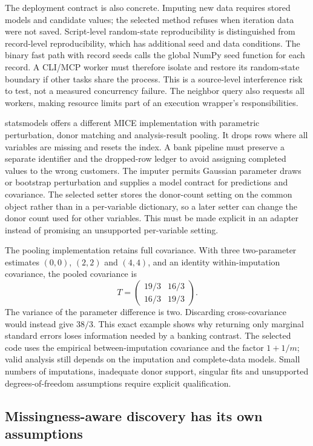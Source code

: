 The deployment contract is also concrete. Imputing new data requires stored models and candidate values; the selected method refuses when iteration data were not saved. Script-level random-state reproducibility is distinguished from record-level reproducibility, which has additional seed and data conditions. The binary fast path with record seeds calls the global NumPy seed function for each record. A CLI/MCP worker must therefore isolate and restore its random-state boundary if other tasks share the process. This is a source-level interference risk to test, not a measured concurrency failure. The neighbor query also requests all workers, making resource limits part of an execution wrapper's responsibilities.\citep{exec25_ptm_miceforest}

statsmodels offers a different MICE implementation with parametric perturbation, donor matching and analysis-result pooling. It drops rows where all variables are missing and resets the index. A bank pipeline must preserve a separate identifier and the dropped-row ledger to avoid assigning completed values to the wrong customers. The imputer permits Gaussian parameter draws or bootstrap perturbation and supplies a model contract for predictions and covariance. The selected setter stores the donor-count setting on the common object rather than in a per-variable dictionary, so a later setter can change the donor count used for other variables. This must be made explicit in an adapter instead of promising an unsupported per-variable setting.\citep{exec25_ptm_statsmodels}

The pooling implementation retains full covariance. With three two-parameter estimates $(0,0)$, $(2,2)$ and $(4,4)$, and an identity within-imputation covariance, the pooled covariance is
\[
 T=\begin{pmatrix}19/3&16/3\\16/3&19/3\end{pmatrix}.
\]
The variance of the parameter difference is two. Discarding cross-covariance would instead give $38/3$. This exact example shows why returning only marginal standard errors loses information needed by a banking contrast. The selected code uses the empirical between-imputation covariance and the factor $1+1/m$; valid analysis still depends on the imputation and complete-data models. Small numbers of imputations, inadequate donor support, singular fits and unsupported degrees-of-freedom assumptions require explicit qualification.\citep{exec25_ptm_statsmodels,exec25_ptm_choice}

\subsection{Missingness-aware discovery has its own assumptions}

